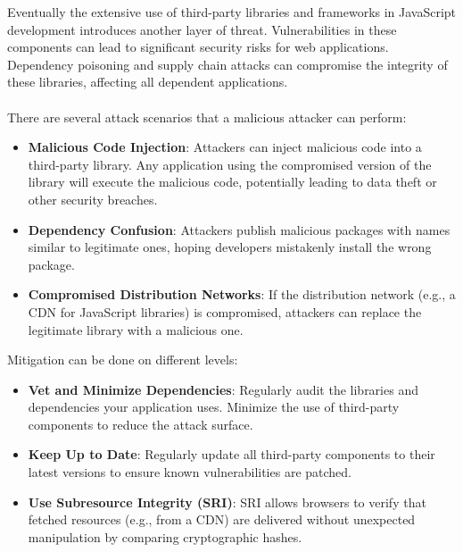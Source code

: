 \documentclass{article}
\begin{document}
Eventually the extensive use of third-party libraries and frameworks in JavaScript development introduces another layer of threat. Vulnerabilities in these components can lead to significant security risks for web applications. Dependency poisoning and supply chain attacks can compromise the integrity of these libraries, affecting all dependent applications.
\\
\\
There are several attack scenarios that a malicious attacker can perform:
\begin{itemize}
	\item \textbf{Malicious Code Injection}: Attackers can inject malicious code into a third-party library. Any application using the compromised version of the library will execute the malicious code, potentially leading to data theft or other security breaches.
	\item \textbf{Dependency Confusion}: Attackers publish malicious packages with names similar to legitimate ones, hoping developers mistakenly install the wrong package.
	\item \textbf{Compromised Distribution Networks}: If the distribution network (e.g., a CDN for JavaScript libraries) is compromised, attackers can replace the legitimate library with a malicious one.
\end{itemize}

Mitigation can be done on different levels:
\begin{itemize}
	\item \textbf{Vet and Minimize Dependencies}: Regularly audit the libraries and dependencies your application uses. Minimize the use of third-party components to reduce the attack surface.
	\item \textbf{Keep Up to Date}: Regularly update all third-party components to their latest versions to ensure known vulnerabilities are patched.
	\item \textbf{Use Subresource Integrity (SRI)}: SRI allows browsers to verify that fetched resources (e.g., from a CDN) are delivered without unexpected manipulation by comparing cryptographic hashes.
\end{itemize}
\end{document}
